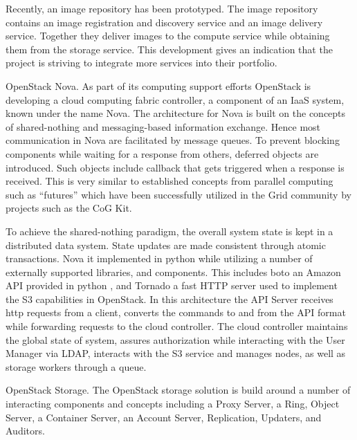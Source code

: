 Recently, an image repository has been prototyped. The image repository contains an image registration and discovery service and an image delivery service. Together they deliver images to the compute service while obtaining them from the storage service. This development gives an indication that the project is striving to integrate more services into their portfolio.
 
OpenStack Nova.  As part of its computing support efforts OpenStack \cite{www/openstack} is developing a cloud computing fabric controller, a component of an IaaS system, known under the name Nova. The architecture for Nova is built on the concepts of  shared-nothing and  messaging-based information exchange. Hence most communication in Nova are facilitated by message queues. To prevent blocking components while waiting for a response from others, deferred objects are introduced. Such objects include callback that gets triggered when a response is received. This is very similar to established concepts from parallel computing such as ``futures'' which have been successfully utilized in the Grid community by projects such as the CoG Kit.

To achieve the shared-nothing paradigm, the overall system state is kept in a distributed data system. State updates are made consistent through atomic transactions. Nova it implemented in python while utilizing a number of externally supported libraries, and components. This includes boto an Amazon API provided in python \cite{www/boto}, and Tornado a fast HTTP server used to implement the S3 capabilities in OpenStack.  In this architecture the API Server receives http requests from a client, converts the commands to and from the API format while forwarding requests to the cloud controller. The cloud controller maintains the global state of system, assures authorization while interacting with the User Manager via LDAP, interacts with the S3 service and manages nodes, as well as storage workers through a queue.

OpenStack Storage. The OpenStack storage solution is build around a number of interacting components and concepts including a Proxy Server, a Ring, Object Server, a Container Server, an Account Server, Replication, Updaters, and Auditors.

